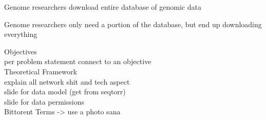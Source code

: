 \documentclass{article}
\begin{document}
    
    
    
\item Genome researchers download entire database of genomic data
\item Genome researchers only need a portion of the database, but end up downloading everything 


    
Objectives\\
per problem statement connect to an objective \\


Theoretical Framework \\
explain all network shit and tech aspect\\



slide for data model (get from seqtorr) \\

slide for data permissions \\

Bittorent Terms -> use a photo sana \\
\end{document}
